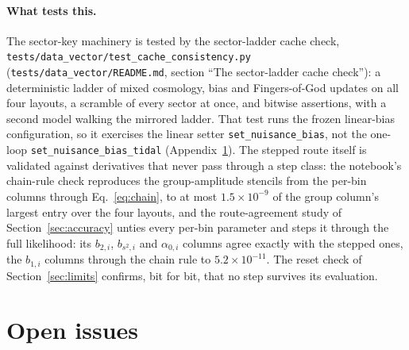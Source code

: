 \documentclass[11pt]{article}
\newcommand{\us}{\_\allowbreak}
\begin{document}
\paragraph{What tests this.}
The sector-key machinery is tested by the sector-ladder cache check,
\texttt{tests/data\us vector/test\us cache\us consistency.py}
(\texttt{tests/data\us vector/README.md}, section ``The sector-ladder
cache check''): a deterministic ladder of mixed cosmology, bias and
Fingers-of-God updates on all four layouts, a scramble of every sector
at once, and bitwise assertions, with a second model walking the
mirrored ladder.  That test runs the frozen linear-bias configuration,
so it exercises the linear setter \texttt{set\us nuisance\us bias},
not the one-loop \texttt{set\us nuisance\us bias\us tidal}
(Appendix~\ref{sec:open}).  The
stepped route itself is validated against derivatives that never pass
through a step class: the notebook's chain-rule check reproduces the
group-amplitude stencils from the per-bin columns through
Eq.~\eqref{eq:chain}, to at most $1.5\times10^{-9}$ of the group
column's largest entry over the four layouts, and the
route-agreement study of Section~\ref{sec:accuracy} unties every
per-bin parameter and steps it through the full likelihood: its
$b_{2,i}$, $b_{s^2,i}$ and $\alpha_{0,i}$ columns agree exactly with
the stepped ones, the $b_{1,i}$ columns through the chain rule to
$5.2\times10^{-11}$.  The reset check of Section~\ref{sec:limits}
confirms, bit for bit, that no step survives its evaluation.

\section{Open issues}
\label{sec:open}
\end{document}
